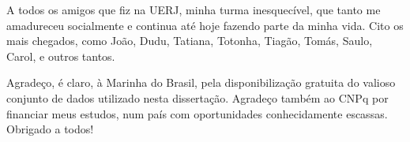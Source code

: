 A todos os amigos que fiz na UERJ, minha turma inesquecível, que tanto me amadureceu socialmente e 
continua até hoje fazendo parte da minha vida. Cito os mais chegados, como João, Dudu, Tatiana, Totonha,
Tiagão, Tomás, Saulo, Carol, e outros tantos. 

Agradeço, é claro, à Marinha do Brasil, pela disponibilização gratuita do valioso conjunto de dados 
utilizado nesta dissertação. Agradeço também ao CNPq por financiar meus estudos, num país com oportunidades
conhecidamente escassas. \\

Obrigado a todos! 






 
